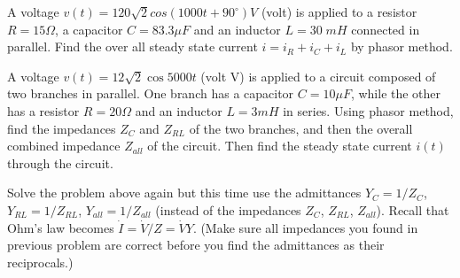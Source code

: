 
\item A voltage $v(t)=120\sqrt{2} cos(1000t+90^\circ) V$ (volt) is applied to 
a resistor $R=15\Omega$, a capacitor $C=83.3\mu F$ and an inductor $L=30\; mH$ 
connected in parallel. Find the over all steady state current $i=i_R+i_C+i_L$ 
by phasor method.


\item A voltage $v(t)=12\sqrt{2} \cos 5000 t$ (volt V) is applied to a circuit
composed of two branches in parallel. One branch has a capacitor $C=10\mu F$,
while the other has a resistor $R=20\Omega$ and an inductor $L=3 mH$ in series.
Using phasor method, find the impedances $Z_C$ and $Z_{RL}$ of the two branches,
and then the overall combined impedance $Z_{all}$ of the circuit. Then find
the steady state current $i(t)$ through the circuit.


\item Solve the problem above again but this time use the admittances 
$Y_C=1/Z_C$, $Y_{RL}=1/Z_{RL}$, $Y_{all}=1/Z_{all}$ (instead of the
impedances $Z_C$, $Z_{RL}$, $Z_{all}$). Recall that Ohm's law becomes
$\dot{I}=\dot{V}/Z=\dot{V}Y$. (Make sure all impedances you found in 
previous problem are correct before you find the admittances as their 
reciprocals.)

